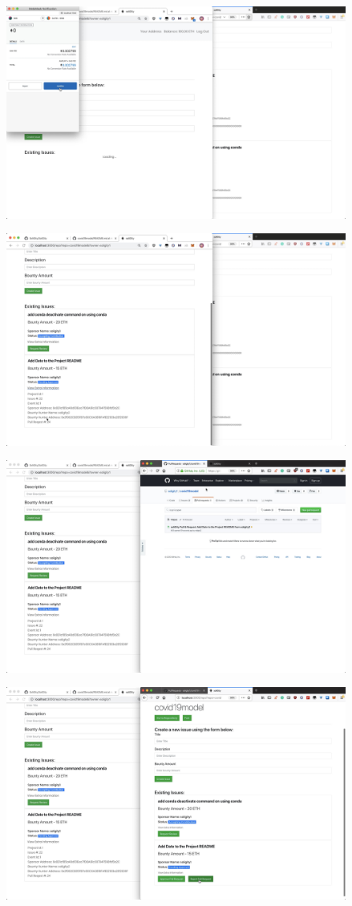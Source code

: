 \documentclass[12pt]{article}
\renewcommand{\_}{\kern-1.5pt\textunderscore\kern-1.5pt}
\begin{document}
\begin{enumerate}
	      \includegraphics[height=7cm]{graphs/35. bob_review_request_metamask}

	      \includegraphics[height=7cm]{graphs/36. issue_info_updated}

	      \includegraphics[height=7cm]{graphs/37. bob_pull_request_github}

	      \includegraphics[height=7cm]{graphs/38. alice_reject_pull_request}


\end{enumerate}
\end{document}

